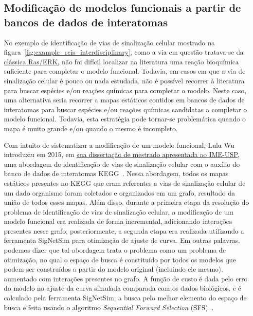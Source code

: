 \documentclass[12pt]{article}
\begin{document}
%
%
%
%



\subsection{Modificação de modelos funcionais a partir de bancos de 
dados de interatomas}

No exemplo de identificação de vias de sinalização celular mostrado na figura~\ref{fig:example_reis_interdisciplinary}, como a via em questão tratava-se da \href{https://en.wikipedia.org/wiki/MAPK/ERK\_pathway}{clássica Ras/ERK}, não foi difícil localizar na literatura uma reação bioquímica suficiente para completar o modelo funcional. Todavia, em casos em que a via de sinalização celular é pouco ou nada estudada, não é possível recorrer à literatura para buscar espécies e/ou reações químicas para completar o modelo. Neste caso, uma alternativa seria recorrer a mapas estáticos contidos em bancos de dados de interatomas para buscar espécies e/ou reações químicas candidatas a completar o modelo funcional. Todavia, esta estratégia pode tornar-se problemática quando o mapa é muito grande e/ou quando o mesmo é incompleto. 

Com intuito de sistematizar a modificação de um modelo funcional, Lulu Wu introduziu em 2015, em \href{http://www.teses.usp.br/teses/disponiveis/45/45134/tde-22082015-085947/pt-br.php}{sua dissertação de mestrado apresentada ao IME-USP}, uma abordagem de identificação de
vias de sinalização celular com o auxílio do banco de dados de interatomas KEGG~\cite{Wu2015metodo}. Nessa abordagem, todos os mapas estáticos presentes no KEGG que eram referentes a vias de sinalização celular de um dado organismo foram coletados e organizados em um grafo, resultado da união de todos esses mapas. Além disso, durante a primeira etapa da resolução do problema de identificação de vias de sinalização celular, a modificação de um modelo funcional era realizada de forma incremental, adicionando interações presentes nesse grafo; posteriormente, a segunda etapa era realizada utilizando a ferramenta SigNetSim para otimização de ajuste de curva. Em outras palavras, podemos dizer que tal abordagem trata o problema como um problema de otimização, no qual o espaço de busca é constituído por todos os modelos que podem ser construídos a  partir do modelo original (incluindo ele mesmo), aumentado com interações presentes no grafo. A função de custo é dada pelo erro do modelo no ajuste da curva simulada comparada com os dados biológicos, e é calculado pela ferramenta SigNetSim; a busca pelo melhor elemento do espaço de busca é feita usando o algoritmo {\it Sequential Forward Selection} (SFS)~\cite{Whitney:1971}.
\end{document}

